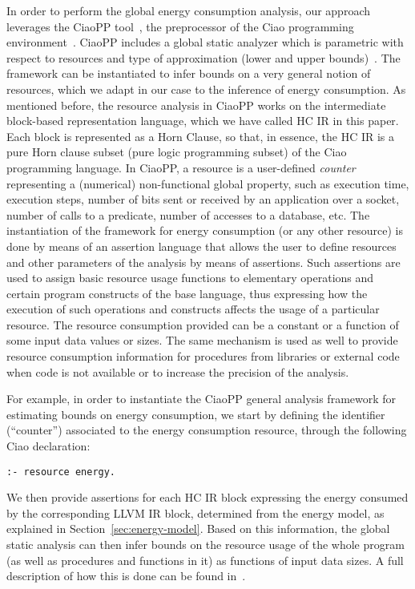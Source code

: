 \documentclass{llncs}
\newcommand{\hcir}{HC IR\xspace}
\newcommand{\llvmir}{LLVM IR\xspace}
\newcommand{\ciao}{Ciao\xspace}
\newcommand{\ciaopp}{CiaoPP\xspace}
\begin{document}
In order to perform the global energy consumption analysis,
our approach leverages the \ciaopp
tool~\cite{ciaopp-sas03-journal-scp}, the preprocessor of the \ciao{}
programming
environment~\cite{hermenegildo11:ciao-design-tplp-short}. \ciaopp
includes a global static analyzer which is parametric with respect to
resources and type of approximation (lower and upper
bounds)~\cite{resource-iclp07,plai-resources-iclp14}. The framework
can be instantiated to infer bounds on a very general notion of
resources, which we adapt in our case to the inference of energy
consumption.
As mentioned before, the resource analysis in \ciaopp works on the
intermediate block-based representation language, which we have called
\hcir in this paper.  Each block is represented as a Horn Clause, so
that, in essence, the \hcir is a pure Horn clause subset (pure logic
programming subset) of the \ciao programming language.
In \ciaopp, a resource is a user-defined \emph{counter} representing a
(numerical) non-functional global property, such as execution time,
execution steps, number of bits sent or received by an application
over a socket, number of calls to a predicate, number of accesses to a
database, etc.
The instantiation of the framework for energy consumption (or any
other resource) is done by means of an assertion language that allows
the user to define resources and other parameters of the analysis by
means of assertions. Such assertions are used to assign basic resource
usage functions to elementary operations and certain program
constructs of the base language, thus expressing how the execution of
such operations and constructs affects the usage of a particular
resource. 
The resource consumption provided can be a constant or a function of
some input data values or sizes.  The same mechanism is used as well
to provide resource consumption information for procedures from
libraries or external code when code is not available or to increase
the precision of the analysis.

For example, in order to instantiate the \ciaopp general analysis
framework for estimating bounds on energy consumption, we start by
defining the identifier (``counter'') associated to the energy
consumption resource, through the following \ciao declaration:
\begin{lstlisting}[language=ciao, basicstyle=\small\ttfamily,]
:- resource energy.
\end{lstlisting}

We then provide assertions for each \hcir block expressing the energy
consumed by the corresponding \llvmir block, determined from the
energy model, as explained in Section~\ref{sec:energy-model}.  Based
on this information, the global static analysis can then infer bounds
on the resource usage of the whole program (as well as procedures and
functions in it) as functions of input data sizes. A full description
of how this is done can be found in~\cite{plai-resources-iclp14}.
\end{document}
